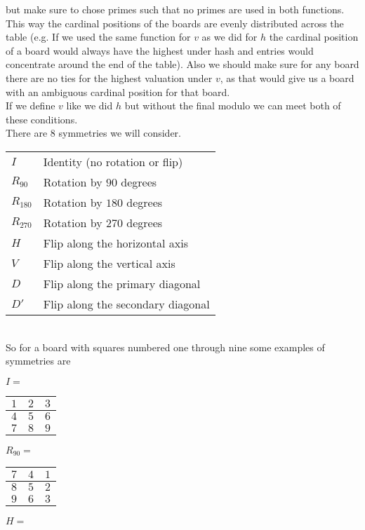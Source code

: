 \documentclass[11pt]{article}
\begin{document}
\begin{enumerate}
\begin{enumerate}
			but make sure to chose primes such that no primes are used
			in both functions. This way the cardinal positions of the
			boards are evenly distributed across the table (e.g. If
			we used the same function for $v$ as we did for $h$ the cardinal
			position of a board would always have the highest under
			hash and entries would concentrate around the end of the
			table). Also we should
			make sure for any board there are no ties for the highest valuation
			under $v$, as that would give us a board with an
			 ambiguous cardinal position for that board.\\
			If we define $v$ like we did $h$ but without the final
			modulo we can meet both of these conditions.\\
			There are $8$ symmetries we will consider.\\
			\begin{tabular} {l l}
				$I$ & Identity (no rotation or flip) \\
				$R_{90} $ & Rotation by $90$ degrees \\  
				$R_{180} $ & Rotation by $180$ degrees \\  
				$R_{270} $ & Rotation by $270$ degrees \\  
				$H $ & Flip along the horizontal axis \\
				$V $ & Flip along the vertical axis \\
				$D $ & Flip along the primary diagonal \\
				$D' $ & Flip along the secondary diagonal \\
			\end{tabular} \\
			So for a board with squares numbered one through nine
			some examples of symmetries are
			\begin{center}
			$I =$
			\begin{tabular}{ c | c | c }
			  $1$ & $2$  & $3$  \\
				\hline
			   $4$ & $5$ &  $6$\\
				\hline
			   $7$ & $8$ &  $9$\\
			\end{tabular} 
			$R_{90} =$
			\begin{tabular}{ c | c | c }
			  $7$ & $4$  & $1$  \\
				\hline
			   $8$ & $5$ &  $2$\\
				\hline
			   $9$ & $6$ &  $3$\\
			\end{tabular} 
			$H = $
			\begin{tabular}{ c | c | c }

\end{tabular}
\end{center}
\end{enumerate}
\end{enumerate}
\end{document}
